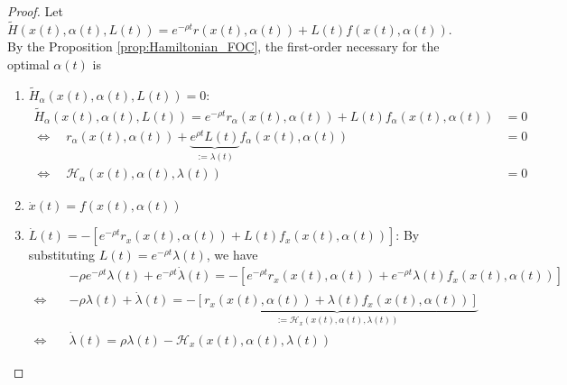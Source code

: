 \documentclass[11pt]{elegantbook}
\begin{document}
\begin{proof}
    Let $\tilde{H}(x(t),\alpha(t),L(t))=e^{-\rho t}r(x(t),\alpha(t))+L(t)f(x(t),\alpha(t))$. By the Proposition \ref{prop:Hamiltonian_FOC}, the first-order necessary for the optimal $\alpha(t)$ is
    \begin{enumerate}
        \item $\tilde{H}_\alpha(x(t),\alpha(t),L(t))=0$:
        \begin{equation}
            \begin{aligned}
                \tilde{H}_\alpha(x(t),\alpha(t),L(t))=e^{-\rho t}r_\alpha(x(t),\alpha(t))+L(t)f_\alpha(x(t),\alpha(t))&=0\\
                \Leftrightarrow\quad r_\alpha(x(t),\alpha(t))+\underbrace{e^{\rho t}L(t)}_{:=\lambda(t)}f_\alpha(x(t),\alpha(t))&=0\\
                \Leftrightarrow\quad \mathcal{H}_\alpha(x(t),\alpha(t),\lambda(t))&=0
            \end{aligned}
            \nonumber
        \end{equation}
        \item $\dot{x}(t)=f(x(t),\alpha(t))$
        \item $\dot{L}(t)=-[e^{-\rho t}r_x(x(t),\alpha(t))+L(t)f_x(x(t),\alpha(t))]$: By substituting $L(t)=e^{-\rho t}\lambda(t)$, we have
        \begin{equation}
            \begin{aligned}
                &-\rho e^{-\rho t}\lambda(t) + e^{-\rho t}\dot{\lambda}(t)=-[e^{-\rho t}r_x(x(t),\alpha(t))+e^{-\rho t}\lambda(t)f_x(x(t),\alpha(t))]\\
                \Leftrightarrow\quad&-\rho\lambda(t) + \dot{\lambda}(t)=-\underbrace{[r_x(x(t),\alpha(t))+\lambda(t)f_x(x(t),\alpha(t))]}_{:=\mathcal{H}_x(x(t),\alpha(t),\lambda(t))}\\
                \Leftrightarrow\quad&\dot{\lambda}(t)=\rho\lambda(t)-\mathcal{H}_x(x(t),\alpha(t),\lambda(t))
            \end{aligned}
            \nonumber
        \end{equation}
    \end{enumerate}
\end{proof}
\end{document}
